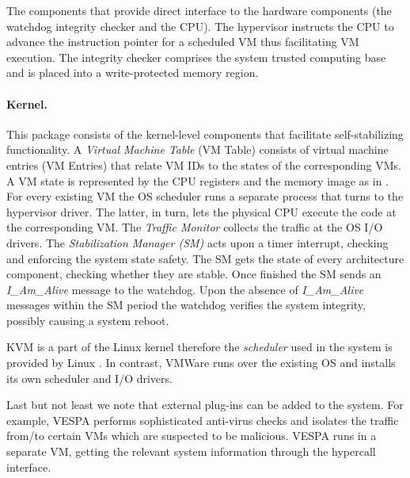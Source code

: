 The components that provide direct interface to the hardware components
(the watchdog integrity checker and the CPU). The hypervisor instructs
the CPU to advance the instruction pointer for a scheduled VM thus
facilitating VM execution. The integrity checker comprises the system
trusted computing base and is placed into a write-protected memory
region. 


\paragraph{Kernel.}

This package consists of the kernel-level components that facilitate
self-stabilizing functionality. A \textit{Virtual Machine Table} (VM
Table) consists of virtual machine entries (VM Entries) that relate
VM IDs to the states of the corresponding VMs. A VM state is represented
by the CPU registers and the memory image as in \cite{4553720}. For
every existing VM the OS scheduler runs a separate process that turns
to the hypervisor driver. The latter, in turn, lets the physical CPU
execute the code at the corresponding VM. The \textit{Traffic Monitor}
collects the traffic at the OS I/O drivers. The \textit{Stabilization
Manager (SM)} acts upon a timer interrupt, checking and enforcing
the system state safety. The SM gets the state of every architecture
component, checking whether they are stable. Once finished the SM
sends an \textit{I\_Am\_Alive }message to the watchdog. Upon the absence
of \textit{I\_Am\_Alive} messages within the SM period the watchdog
verifies the system integrity, possibly causing a system reboot. 

KVM \cite{kvm-site} is a part of the Linux kernel therefore the \textit{scheduler}
used in the system is provided by Linux . In contrast, VMWare \cite{vmware-site}
runs over the existing OS and installs its own scheduler and I/O drivers. 

Last but not least we note that external plug-ins can be added to
the system. For example, VESPA \cite{Wailly:2012:VMS:2371536.2371564}
performs sophisticated anti-virus checks and isolates the traffic
from/to certain VMs which are suspected to be malicious. VESPA runs
in a separate VM, getting the relevant system information through
the hypercall interface. 

